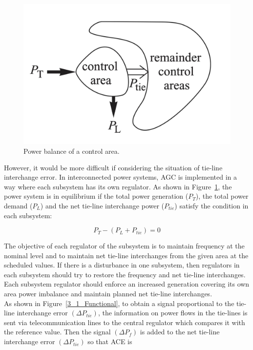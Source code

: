 \begin{figure}[t]
\center
\includegraphics[scale=0.27]{figure/3_1_Power.png}
\caption{Power balance of a control area.}
\label{3_1_Power}
\end{figure}

However, it would be more difficult if considering the situation of tie-line interchange error. In interconnected power systems, AGC is implemented in a way where each subsystem has its own regulator. As shown in Figure~\ref{3_1_Power}, the power system is in equilibrium if the total power generation ($P_T$), the total power demand ($P_L$) and the net tie-line interchange power ($P_{t i e}$) satisfy the condition in each subsystem: 

\begin{equation} \label{eq1}
P_T - (P_L + P_{t i e}) = 0
\end{equation}

The objective of each regulator of the subsystem is to \cite{machowski2011power} maintain frequency at the nominal level and to maintain net tie-line interchanges from the given area at the scheduled values. If there is a disturbance in one subsystem, then regulators in each subsystem should try to restore the frequency and net tie-line interchanges. Each subsystem regulator should enforce an increased generation covering its own area power imbalance and maintain planned net tie-line interchanges.\\

As shown in Figure~\ref{3_1_Functional}, to obtain a signal proportional to the tie-line interchange error $(\Delta P_{tie})$, the information on power flows in the tie-lines is sent via telecommunication lines to the central regulator which compares it with the reference value. Then the signal $(\Delta P_f)$ is added to the net tie-line interchange error $(\Delta P_{tie})$ so that ACE is


